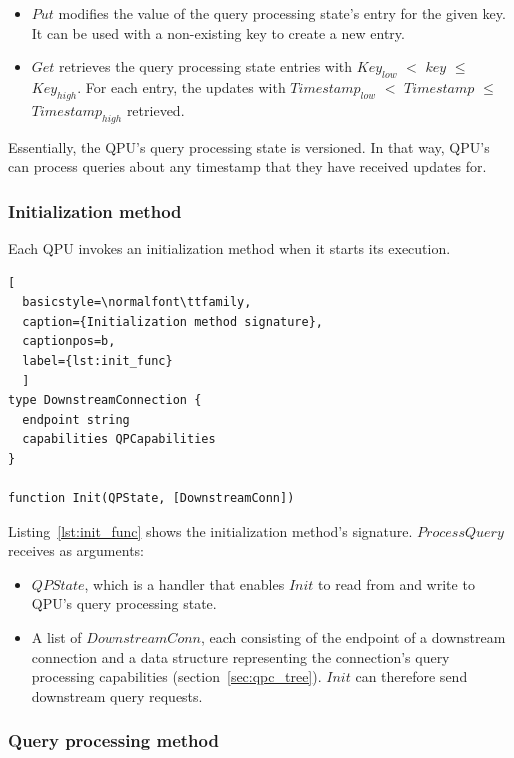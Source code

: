 \begin{itemize}
  \item $Put$ modifies the value of the query processing state's entry for the given key.
  It can be used with a non-existing key to create a new entry.

  \item $Get$ retrieves the query processing state entries with $Key_{low}$ $<$ $key$ $\leq$ $Key_{high}$.
  For each entry, the updates with $Timestamp_{low}$ $<$ $Timestamp$ $\leq$ $Timestamp_{high}$ retrieved.
\end{itemize}

Essentially, the QPU's query processing state is versioned.
In that way, QPU's can process queries about any timestamp that they have received updates for.


\subsubsection{Initialization method}
\label{sec:initialization_func}

Each QPU invokes an initialization method when it starts its execution.

\begin{lstlisting}[
  basicstyle=\normalfont\ttfamily,
  caption={Initialization method signature},
  captionpos=b,
  label={lst:init_func}
  ]
type DownstreamConnection {
  endpoint string
  capabilities QPCapabilities
}

function Init(QPState, [DownstreamConn])
\end{lstlisting}

\noindent
Listing~\ref{lst:init_func} shows the initialization method's signature.
$ProcessQuery$ receives as arguments:
\begin{itemize}
  \item $QPState$, which is a handler that enables $Init$ to read from and write to QPU's query processing state.

  \item A list of $DownstreamConn$, each consisting of the endpoint of a downstream connection and a data structure
  representing the connection's query processing capabilities (section~\ref{sec:qpc_tree}).
  $Init$ can therefore send downstream query requests.
\end{itemize}


\subsubsection{Query processing method}
\label{sec:query_processing_func}

